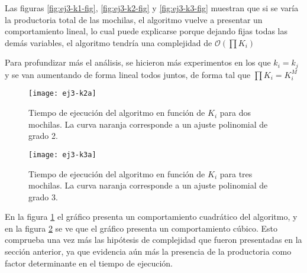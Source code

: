 Las figuras \ref{fig:ej3-k1-fig}, \ref{fig:ej3-k2-fig} y \ref{fig:ej3-k3-fig} muestran que si se varía la productoria total de las mochilas, el algoritmo vuelve a presentar un comportamiento lineal, lo cual puede explicarse porque dejando fijas todas las demás variables, el algoritmo tendría una complejidad de $\mathcal{O}(\prod K_i)$

\newpage

Para profundizar más el análisis, se hicieron más experimentos en los que $k_i = k_j$ y se van aumentando de forma lineal todos juntos, de forma tal que $\prod K_i = K_i^M$

\begin{figure}[H]
		\centering
		\texttt{[image: ej3-k2a]}
		\caption{Tiempo de ejecución del algoritmo en función de $K_i$ para dos mochilas. La curva naranja corresponde a un ajuste polinomial de grado 2.}
		\label{fig:ej3-k2a-fig}
	\end{figure}	

\begin{figure}[H]
		\centering
		\texttt{[image: ej3-k3a]}
		\caption{Tiempo de ejecución del algoritmo en función de $K_i$ para tres mochilas. La curva naranja corresponde a un ajuste polinomial de grado 3.}
		\label{fig:ej3-k3a-fig}
	\end{figure}	

En la figura \ref{fig:ej3-k2a-fig} el gráfico presenta un comportamiento cuadrático del algoritmo, y en la figura \ref{fig:ej3-k3a-fig} se ve que el gráfico presenta un comportamiento cúbico. Esto comprueba una vez más las hipótesis de complejidad que fueron presentadas en la sección anterior, ya que evidencia aún más la presencia de la productoria como factor determinante en el tiempo de ejecución.
